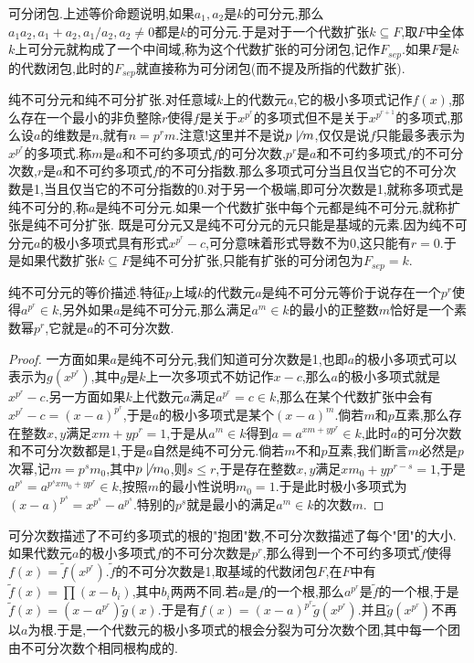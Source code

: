 可分闭包.上述等价命题说明,如果$a_1,a_2$是$k$的可分元,那么$a_1a_2,a_1+a_2,a_1/a_2,a_2\not=0$都是$k$的可分元.于是对于一个代数扩张$k\subseteq F$,取$F$中全体$k$上可分元就构成了一个中间域,称为这个代数扩张的可分闭包,记作$F_{sep}$.如果$F$是$k$的代数闭包,此时的$F_{sep}$就直接称为可分闭包(而不提及所指的代数扩张).

纯不可分元和纯不可分扩张.对任意域$k$上的代数元$a$,它的极小多项式记作$f(x)$,那么存在一个最小的非负整除$r$使得$f$是关于$x^{p^r}$的多项式但不是关于$x^{p^{r+1}}$的多项式,那么设$a$的维数是$n$,就有$n=p^rm$.注意!这里并不是说$p\not\mid m$,仅仅是说$f$只能最多表示为$x^{p^r}$的多项式.称$m$是$a$和不可约多项式$f$的可分次数,$p^r$是$a$和不可约多项式$f$的不可分次数,$r$是$a$和不可约多项式$f$的不可分指数.那么多项式可分当且仅当它的不可分次数是1,当且仅当它的不可分指数的0.对于另一个极端,即可分次数是1,就称多项式是纯不可分的,称$a$是纯不可分元.如果一个代数扩张中每个元都是纯不可分元,就称扩张是纯不可分扩张.
既是可分元又是纯不可分元的元只能是基域的元素.因为纯不可分元$a$的极小多项式具有形式$x^{p^r}-c$,可分意味着形式导数不为0,这只能有$r=0$.于是如果代数扩张$k\subseteq F$是纯不可分扩张,只能有扩张的可分闭包为$F_{sep}=k$.

纯不可分元的等价描述.特征$p$上域$k$的代数元$a$是纯不可分元等价于说存在一个$p^r$使得$a^{p^r}\in k$,另外如果$a$是纯不可分元,那么满足$a^m\in k$的最小的正整数$m$恰好是一个素数幂$p^r$,它就是$a$的不可分次数.
\begin{proof}

一方面如果$a$是纯不可分元,我们知道可分次数是1,也即$a$的极小多项式可以表示为$g(x^{p^r})$,其中$g$是$k$上一次多项式不妨记作$x-c$,那么$a$的极小多项式就是$x^{p^r}-c$.另一方面如果$k$上代数元$a$满足$a^{p^r}=c\in k$,那么在某个代数扩张中会有$x^{p^r}-c=(x-a)^{p^r}$,于是$a$的极小多项式是某个$(x-a)^m$.倘若$m$和$p$互素,那么存在整数$x,y$满足$xm+yp^r=1$,于是从$a^m\in k$得到$a=a^{xm+yp^r}\in k$,此时$a$的可分次数和不可分次数都是1,于是$a$自然是纯不可分元.倘若$m$不和$p$互素,我们断言$m$必然是$p$次幂,记$m=p^sm_0$,其中$p\not\mid m_0$,则$s\le r$,于是存在整数$x,y$满足$xm_0+yp^{r-s}=1$,于是$a^{p^s}=a^{p^sxm_0+yp^r}\in k$,按照$m$的最小性说明$m_0=1$.于是此时极小多项式为$(x-a)^{p^s}=x^{p^s}-a^{p^s}$.特别的$p^s$就是最小的满足$a^m\in k$的次数$m$.
\end{proof}

可分次数描述了不可约多项式的根的"抱团"数,不可分次数描述了每个"团"的大小.如果代数元$a$的极小多项式$f$的不可分次数是$p^r$,那么得到一个不可约多项式$\widetilde{f}$使得$f(x)=\widetilde{f}(x^{p^r})$.$\widetilde{f}$的不可分次数是1,取基域的代数闭包$F$,在$F$中有$\widetilde{f}(x)=\prod(x-b_i)$,其中$b_i$两两不同.若$a$是$f$的一个根,那么$a^{p^r}$是$\widetilde{f}$的一个根,于是$\widetilde{f}(x)=(x-a^{p^r})\widetilde{g}(x)$.于是有$f(x)=(x-a)^{p^r}\widetilde{g}(x^{p^r})$.并且$\widetilde{g}(x^{p^r})$不再以$a$为根.于是,一个代数元的极小多项式的根会分裂为可分次数个团,其中每一个团由不可分次数个相同根构成的.

